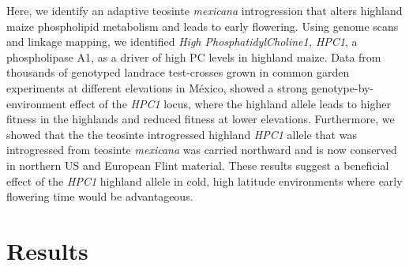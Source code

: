 \documentclass[9pt,twocolumn,twoside,lineno]{BioRxiv}
\begin{document}
Here, we identify an adaptive teosinte \textit{mexicana} introgression that alters highland maize phospholipid metabolism and leads to early flowering.
Using genome scans and linkage mapping, we identified \textit{High PhosphatidylCholine1, HPC1}, a phospholipase A1, as a driver of high PC levels in highland maize. 
Data from thousands of genotyped landrace test-crosses grown in common garden experiments at different elevations in México, showed a strong genotype-by-environment effect of the \textit{HPC1} locus, where the highland allele leads to higher fitness in the highlands and reduced fitness at lower elevations.
Furthermore, we showed that the the teosinte introgressed highland \textit{HPC1} allele that was introgressed from teosinte \textit{mexicana} was carried northward and is now conserved in northern US and European Flint material.
These results suggest a beneficial effect of the \textit{HPC1} highland allele in cold, high latitude environments where early flowering time would be advantageous.

\section{Results}
\label{sec:results}
\end{document}
